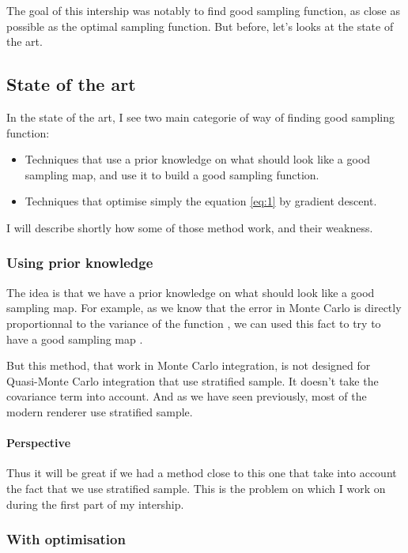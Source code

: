 \documentclass{classeENS}
\begin{document}
The goal of this intership was notably to find good sampling function, as close as 
possible as the optimal sampling function. But before, let's looks at the state of the art.

\subsection{State of the art}

In the state of the art, I see two main categorie of way of finding good sampling function:
\begin{itemize}
    \item Techniques that use a prior knowledge on what should look like a good sampling map, 
    and use it to build a good sampling function.
    \item Techniques that optimise simply the equation \ref{eq:1} by gradient descent.
\end{itemize}
I will describe shortly how some of those method work, and their weakness.

\subsubsection{Using prior knowledge}

\par The idea is that we have a prior knowledge on what should look like a good 
sampling map. For example, as we know that the error in Monte Carlo 
is directly proportionnal to the variance of the function \label{eq:variance},
we can used this fact to try to have a good sampling map \cite{10.1145/325165.325179}.

\par But this method, that work in Monte Carlo integration, is not designed for
Quasi-Monte Carlo integration that use stratified sample. It doesn't take the 
covariance term into account. 
And as we have seen previously, most of the modern renderer use stratified sample. 

\paragraph*{Perspective} Thus it will be great if we had a method close to this one that take into account
the fact that we use stratified sample. This is the problem on which I work on during the first
part of my intership.

\subsubsection{With optimisation}
\end{document}
